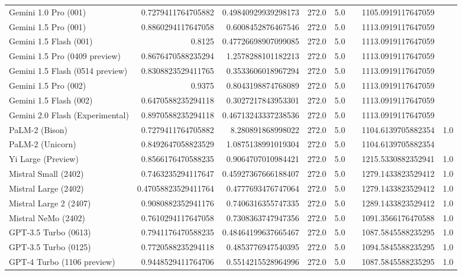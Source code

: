 \begin{table}[htp]
{\begin{tabular}{lrrrrrrr}
Gemini 1.0 Pro (001) & 0.7279411764705882 & 0.49840929939298173 & 272.0 & 5.0 &  & 1105.0919117647059 &  \\
Gemini 1.5 Pro (001) & 0.8860294117647058 & 0.6008452876467546 & 272.0 & 5.0 &  & 1113.0919117647059 &  \\
Gemini 1.5 Flash (001) & 0.8125 & 0.47726698907099085 & 272.0 & 5.0 &  & 1113.0919117647059 &  \\
Gemini 1.5 Pro (0409 preview) & 0.8676470588235294 & 1.2578288101182213 & 272.0 & 5.0 &  & 1113.0919117647059 &  \\
Gemini 1.5 Flash (0514 preview) & 0.8308823529411765 & 0.3533606018967294 & 272.0 & 5.0 &  & 1113.0919117647059 &  \\
Gemini 1.5 Pro (002) & 0.9375 & 0.8043198874768089 & 272.0 & 5.0 &  & 1113.0919117647059 &  \\
Gemini 1.5 Flash (002) & 0.6470588235294118 & 0.3027217843953301 & 272.0 & 5.0 &  & 1113.0919117647059 &  \\
Gemini 2.0 Flash (Experimental) & 0.8970588235294118 & 0.46713243337238536 & 272.0 & 5.0 &  & 1113.0919117647059 &  \\
PaLM-2 (Bison) & 0.7279411764705882 & 8.280891868998022 & 272.0 & 5.0 &  & 1104.6139705882354 & 1.0 \\
PaLM-2 (Unicorn) & 0.8492647058823529 & 1.0875138991019304 & 272.0 & 5.0 &  & 1104.6139705882354 &  \\
Yi Large (Preview) & 0.8566176470588235 & 0.9064707010984421 & 272.0 & 5.0 &  & 1215.5330882352941 & 1.0 \\
Mistral Small (2402) & 0.7463235294117647 & 0.45927367666188407 & 272.0 & 5.0 &  & 1279.1433823529412 & 1.0 \\
Mistral Large (2402) & 0.47058823529411764 & 0.4777693476747064 & 272.0 & 5.0 &  & 1279.1433823529412 & 1.0 \\
Mistral Large 2 (2407) & 0.9080882352941176 & 0.7406316355747335 & 272.0 & 5.0 &  & 1289.1433823529412 & 1.0 \\
Mistral NeMo (2402) & 0.7610294117647058 & 0.7308363747947356 & 272.0 & 5.0 &  & 1091.3566176470588 & 1.0 \\
GPT-3.5 Turbo (0613) & 0.7941176470588235 & 0.48464199637665467 & 272.0 & 5.0 &  & 1087.5845588235295 & 1.0 \\
GPT-3.5 Turbo (0125) & 0.7720588235294118 & 0.4853776947540395 & 272.0 & 5.0 &  & 1094.5845588235295 & 1.0 \\
GPT-4 Turbo (1106 preview) & 0.9448529411764706 & 0.5514215528964996 & 272.0 & 5.0 &  & 1087.5845588235295 & 1.0 \\

\end{tabular}}
\end{table}
